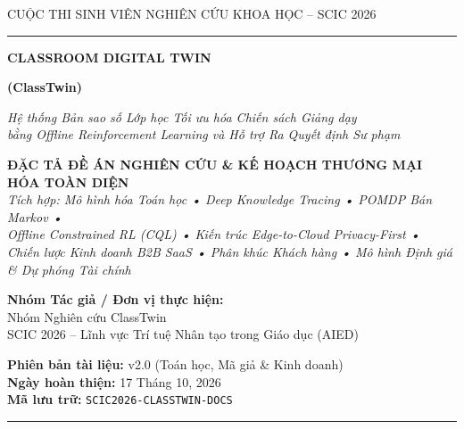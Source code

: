 \documentclass[11pt,a4paper]{article}
\begin{document}
\begin{titlepage}
  \centering
  \vspace*{8mm}
  {\scshape\Large CUỘC THI SINH VIÊN NGHIÊN CỨU KHOA HỌC -- SCIC 2026\par}
  \vspace{3mm}
  {\color{TealPrimary}\rule{\textwidth}{1.5pt}\par}
  \vspace{15mm}

  {\Huge\bfseries\color{NavyDark} CLASSROOM DIGITAL TWIN\par}
  \vspace{3mm}
  {\LARGE\bfseries\color{TealPrimary} (ClassTwin)\par}
  \vspace{8mm}
  
  {\Large\itshape Hệ thống Bản sao số Lớp học Tối ưu hóa Chiến sách Giảng dạy\\bằng Offline Reinforcement Learning và Hỗ trợ Ra Quyết định Sư phạm\par}
  \vspace{10mm}

  \begin{tcolorbox}[colback=LightBg, colframe=NavyBlue, boxrule=1pt, arc=4pt, width=0.92\textwidth]
    \centering\small
    \textbf{ĐẶC TẢ ĐỀ ÁN NGHIÊN CỨU \& KẾ HOẠCH THƯƠNG MẠI HÓA TOÀN DIỆN}\\
    \vspace{2mm}
    \textit{Tích hợp: Mô hình hóa Toán học • Deep Knowledge Tracing • POMDP Bán Markov •\\
    Offline Constrained RL (CQL) • Kiến trúc Edge-to-Cloud Privacy-First •\\
    Chiến lược Kinh doanh B2B SaaS • Phân khúc Khách hàng • Mô hình Định giá \& Dự phóng Tài chính}
  \end{tcolorbox}

  \vfill

  \begin{minipage}{0.48\textwidth}
    \textbf{Nhóm Tác giả / Đơn vị thực hiện:}\\
    Nhóm Nghiên cứu ClassTwin\\
    SCIC 2026 -- Lĩnh vực Trí tuệ Nhân tạo trong Giáo dục (AIED)
  \end{minipage}
  \hfill
  \begin{minipage}{0.45\textwidth}
    \raggedleft
    \textbf{Phiên bản tài liệu:} v2.0 (Toán học, Mã giả \& Kinh doanh)\\
    \textbf{Ngày hoàn thiện:} 17 Tháng 10, 2026\\
    \textbf{Mã lưu trữ:} \texttt{SCIC2026-CLASSTWIN-DOCS}
  \end{minipage}

  \vspace{8mm}
  {\color{TealPrimary}\rule{\textwidth}{1pt}\par}
\end{titlepage}
\end{document}
